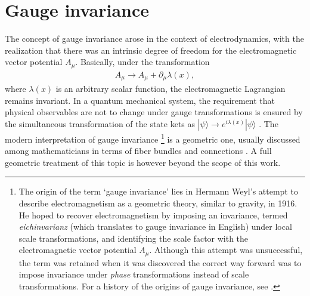 \section{Gauge invariance}\label{sec:gauge_invariance}

The concept of gauge invariance arose in the context of electrodynamics, with the realization that there was an intrinsic degree of freedom for the electromagnetic vector potential $A_\mu$. Basically, under the transformation 
\begin{align}
  A_\mu\rightarrow A_\mu + \partial_\mu \lambda(x),
  \label{eq:gauge_transformation}
\end{align}
where $\lambda(x)$ is an arbitrary scalar function, the electromagnetic Lagrangian remains invariant. In a quantum mechanical system, the requirement that physical observables are not to change under gauge transformations is ensured by the simultaneous transformation of the state kets as $|\psi\rangle\rightarrow e^{i\lambda(x)}|\psi\rangle$ \citep{Sakurai2010}. The modern interpretation of gauge invariance
\footnote{The origin of the term `gauge invariance' lies in Hermann Weyl's attempt to describe electromagnetism as a geometric theory, similar to gravity, in 1916. He hoped to recover electromagnetism by imposing an invariance, termed \emph{eichinvarianz} (which translates to gauge invariance in English)  under local scale transformations, and identifying the scale factor with the electromagnetic vector potential $A_\mu$. Although this attempt was unsuccessful, the term was retained when it was discovered the correct way forward was to impose invariance under \emph{phase} transformations instead of scale transformations. For a history of the origins of gauge invariance, see \citep{Jackson2001}.}
 is a geometric one, usually discussed among mathematicians in terms of fiber bundles and connections \citep{Cheng1985}. A full geometric treatment of this topic is however beyond the scope of this work.

